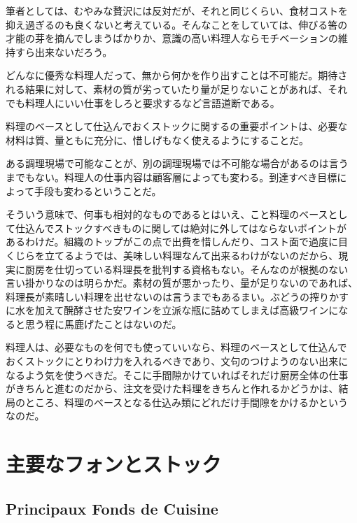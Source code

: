 筆者としては、むやみな贅沢には反対だが、それと同じくらい、食材コストを
抑え過ぎるのも良くないと考えている。そんなことをしていては、伸びる筈の
才能の芽を摘んでしまうばかりか、意識の高い料理人ならモチベーションの維
持すら出来ないだろう。

どんなに優秀な料理人だって、無から何かを作り出すことは不可能だ。期待さ
れる結果に対して、素材の質が劣っていたり量が足りないことがあれば、それ
でも料理人にいい仕事をしろと要求するなど言語道断である。

料理のベースとして仕込んでおくストックに関するの重要ポイントは、必要な
材料は質、量ともに充分に、惜しげもなく使えるようにすることだ。

ある調理現場で可能なことが、別の調理現場では不可能な場合があるのは言う
までもない。料理人の仕事内容は顧客層によっても変わる。到達すべき目標に
よって手段も変わるということだ。

そういう意味で、何事も相対的なものであるとはいえ、こと料理のベースとし
て仕込んでストックすべきものに関しては絶対に外してはならないポイントが
あるわけだ。組織のトップがこの点で出費を惜しんだり、コスト面で過度に目
くじらを立てるようでは、美味しい料理なんて出来るわけがないのだから、現
実に厨房を仕切っている料理長を批判する資格もない。そんなのが根拠のない
言い掛かりなのは明らかだ。素材の質が悪かったり、量が足りないのであれば、
料理長が素晴しい料理を出せないのは言うまでもあるまい。ぶどうの搾りかす
に水を加えて醗酵させた安ワインを立派な瓶に詰めてしまえば高級ワインにな
ると思う程に馬鹿げたことはないのだ。

料理人は、必要なものを何でも使っていいなら、料理のベースとして仕込んで
おくストックにとりわけ力を入れるべきであり、文句のつけようのない出来に
なるよう気を使うべきだ。そこに手間隙かけていればそれだけ厨房全体の仕事
がきちんと進むのだから、注文を受けた料理をきちんと作れるかどうかは、結
局のところ、料理のベースとなる仕込み類にどれだけ手間隙をかけるかという
なのだ。

\hypertarget{ux4e3bux8981ux306aux30d5ux30a9ux30f3ux3068ux30b9ux30c8ux30c3ux30af}{%
\section{主要なフォンとストック}\label{ux4e3bux8981ux306aux30d5ux30a9ux30f3ux3068ux30b9ux30c8ux30c3ux30af}}

\hypertarget{principaux-fonds-de-cuisine}{%
\subsection{Principaux Fonds de
Cuisine}\label{principaux-fonds-de-cuisine}}

